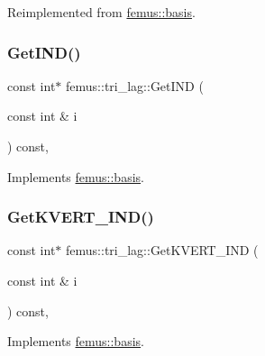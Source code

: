 Reimplemented from \mbox{\hyperlink{classfemus_1_1basis_a2ba867dcfa634c47f1c52caddd9bfdba}{femus\+::basis}}.

\mbox{\label{classfemus_1_1tri__lag_a4418a7f1b7f2402a647232e7d42b1ce0}} 
\subsubsection{\texorpdfstring{Get\+I\+N\+D()}{GetIND()}}
{\footnotesize\ttfamily const int$\ast$ femus\+::tri\+\_\+lag\+::\+Get\+I\+ND (\begin{DoxyParamCaption}\item[{const int \&}]{i }\end{DoxyParamCaption}) const\hspace{0.3cm}{\ttfamily [inline]}, {\ttfamily [virtual]}}



Implements \mbox{\hyperlink{classfemus_1_1basis_a3f63ad97ce70cd4a1196ede69f1f144b}{femus\+::basis}}.

\mbox{\label{classfemus_1_1tri__lag_a16e3ec116476466d968402ba961917b4}} 
\subsubsection{\texorpdfstring{Get\+K\+V\+E\+R\+T\+\_\+\+I\+N\+D()}{GetKVERT\_IND()}}
{\footnotesize\ttfamily const int$\ast$ femus\+::tri\+\_\+lag\+::\+Get\+K\+V\+E\+R\+T\+\_\+\+I\+ND (\begin{DoxyParamCaption}\item[{const int \&}]{i }\end{DoxyParamCaption}) const\hspace{0.3cm}{\ttfamily [inline]}, {\ttfamily [virtual]}}



Implements \mbox{\hyperlink{classfemus_1_1basis_a95ceb3feae4c484b0baa6a4d35d38909}{femus\+::basis}}.

\mbox{\label{classfemus_1_1tri__lag_adbc5aaa467d849777aa97a6339dd2c4d}} 
